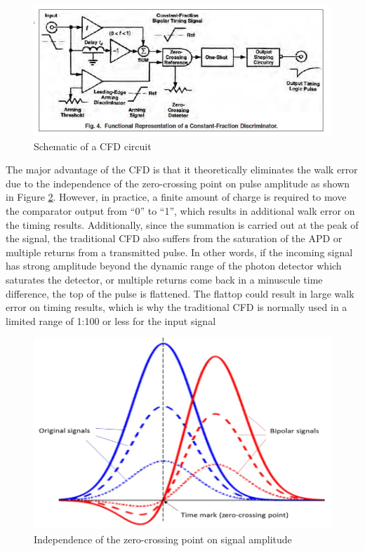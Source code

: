 \begin{figure}[t!p]
\centering
\includegraphics[width=.8\textwidth]{figures/chapter3_TDC/cfd_circuit.jpg}
\caption{Schematic of a CFD circuit}
\label{fig:TDC_cfdcircuit}
\end{figure}
The major advantage of the CFD is that it theoretically eliminates the walk error due to the independence of the zero-crossing point on pulse amplitude as shown in Figure \ref{fig:cfd_zerocrossing}. However, in practice, a finite amount of charge is required to move the comparator output from “0” to “1”, which results in additional walk error on the timing results\citep{nakhostin2017signal}. Additionally, since the summation is carried out at the peak of the signal, the traditional CFD also suffers from the saturation of the APD or multiple returns from a transmitted pulse. In other words, if the incoming signal has strong amplitude beyond the dynamic range of the photon detector which saturates the detector, or multiple returns come back in a minuscule time difference, the top of the pulse is flattened. The flattop could result in large walk error on timing results, which is why the traditional CFD is normally used in a limited range of 1:100 or less for the input signal\citep{kurtti2011integrated}\par
\begin{figure}[t!p]
\centering
\includegraphics[width=.8\textwidth]{figures/chapter3_TDC/cfd_zerocrossing.jpg}
\caption{Independence of the zero-crossing point on signal amplitude}
\label{fig:cfd_zerocrossing}
\end{figure}
